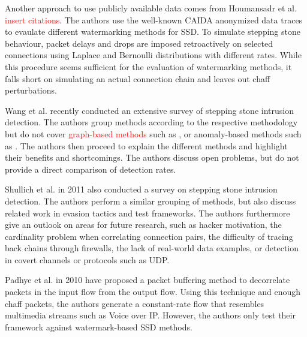 \documentclass[runningheads]{llncs}\usepackage[]{graphicx}\usepackage[]{color}
\begin{document}
Another approach to use publicly available data comes from Houmansadr et al. \textcolor{red}{insert citations}. The authors use the well-known CAIDA anonymized data traces \cite{CAIDA2018} to evaulate different watermarking methods for SSD. To simulate stepping stone behaviour, packet delays and drops are imposed retroactively on selected connections using Laplace and Bernoulli distributions with different rates. While this procedure seems sufficient for the evaluation of watermarking methods, it falls short on simulating an actual connection chain and leaves out chaff perturbations. 


Wang et al. \cite{wang2018research} recently conducted an extensive survey of  stepping stone intrusion detection. The authors group methods according to the respective methodology  
but do not cover \textcolor{red}{graph-based methods} such as \cite{gamarra2018analysis}, %
or anomaly-based methods such as \cite{di2011detecting}.%
The authors then proceed to explain the different methods and highlight their benefits and shortcomings. The authors discuss open problems, but do not provide a direct comparison of detection rates. 

Shullich et al. \cite{shullich2011survey} in 2011 also conducted a survey on stepping stone intrusion detection. The authors perform a similar grouping of methods, but also discuss related work in evasion tactics and test frameworks. The authors furthermore give an outlook on areas for future research, such as hacker motivation, the cardinality problem when correlating connection pairs, the difficulty of tracing back chains through firewalls, the lack of real-world data examples, or detection in covert channels or protocols such as UDP.  

Padhye et al. \cite{padhye2010evading} in 2010 have proposed a packet buffering method to decorrelate packets in the input flow from the output flow. Using this technique and enough chaff packets, the authors generate a constant-rate flow that resembles multimedia streams such as Voice over IP. However, the authors only test their framework against watermark-based SSD methods. 
\end{document}
